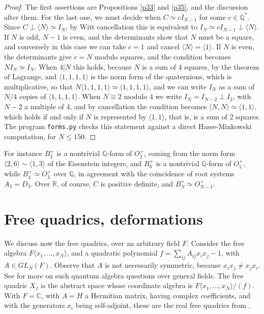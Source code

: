 \documentclass[11pt]{amsart}
\theoremstyle{definition}
\begin{document}
\begin{proof}
The first assertions are Propositions \ref{p33} and \ref{p35}, and the discussion after them. For the last one, we must decide when $C\simeq cI_{N-1}$ for some $c\in\mathbb Q^*$. Since $C\perp\langle N\rangle\simeq I_N$, by Witt cancellation this is equivalent to $I_N\simeq cI_{N-1}\perp\langle N\rangle$. If $N$ is odd, $N-1$ is even, and the determinants show that $N$ must be a square, and conversely in this case we can take $c=1$ and cancel $\langle N\rangle=\langle1\rangle$. If $N$ is even, the determinants give $c=N$ modulo squares, and the condition becomes $NI_N\simeq I_N$. When $4|N$ this holds, because $N$ is a sum of 4 squares, by the theorem of Lagrange, and $\langle1,1,1,1\rangle$ is the norm form of the quaternions, which is multiplicative, so that $N\langle1,1,1,1\rangle\simeq\langle1,1,1,1\rangle$, and we can write $I_N$ as a sum of $N/4$ copies of $\langle1,1,1,1\rangle$. When $N\equiv2$ modulo 4 we write $I_N=I_{N-2}\perp I_2$, with $N-2$ a multiple of 4, and by cancellation the condition becomes $\langle N,N\rangle\simeq\langle1,1\rangle$, which holds if and only if $N$ is represented by $\langle1,1\rangle$, that is, is a sum of 2 squares. The program {\tt forms.py} checks this statement against a direct Hasse-Minkowski computation, for $N\leq150$.
\end{proof}

For instance $B_3^+$ is a nontrivial $\mathbb Q$-form of $O_2^+$, coming from the norm form $\langle2,6\rangle\sim\langle1,3\rangle$ of the Eisenstein integers, and $B_6^+$ is a nontrivial $\mathbb Q$-form of $O_5^+$, while $B_4^+\simeq O_3^+$ over $\mathbb Q$, in agreement with the coincidence of root systems $A_3=D_3$. Over $\mathbb R$, of course, $C$ is positive definite, and $B_N^+\simeq O_{N-1}^+$.

\section{Free quadrics, deformations}

We discuss now the free quadrics, over an arbitrary field $F$. Consider the free algebra $F\langle x_1,\ldots,x_N\rangle$, and a quadratic polynomial $f=\sum_{ij}A_{ij}x_ix_j-1$, with $A\in GL_N(F)$. Observe that $A$ is not necessarily symmetric, because $x_ix_j\neq x_jx_i$. See \cite{bqa} for more on such quantum algebra questions over general fields. The free quadric $X_f$ is the abstract space whose coordinate algebra is $F\langle x_1,\ldots,x_N\rangle/(f)$. With $F=\mathbb C$, with $A=H$ a Hermitian matrix, having complex coefficients, and with the generators $x_i$ being self-adjoint, these are the real free quadrics from \cite{fba}.
\end{document}
